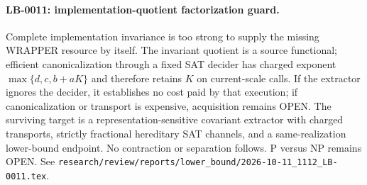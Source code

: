 \paragraph{LB-0011: implementation-quotient factorization guard.}
Complete implementation invariance is too strong to supply the missing
WRAPPER resource by itself.  The invariant quotient is a source functional;
efficient canonicalization through a fixed SAT decider has charged exponent
$\max\{d,c,b+aK\}$ and therefore retains $K$ on current-scale calls.  If the
extractor ignores the decider, it establishes no cost paid by that execution;
if canonicalization or transport is expensive, acquisition remains OPEN.
The surviving target is a representation-sensitive covariant extractor with
charged transports, strictly fractional hereditary SAT channels, and a
same-realization lower-bound endpoint.  No contraction or separation follows.
P versus NP remains OPEN.  See
\texttt{research/review/reports/lower\_bound/2026-10-11\_1112\_LB-0011.tex}.
